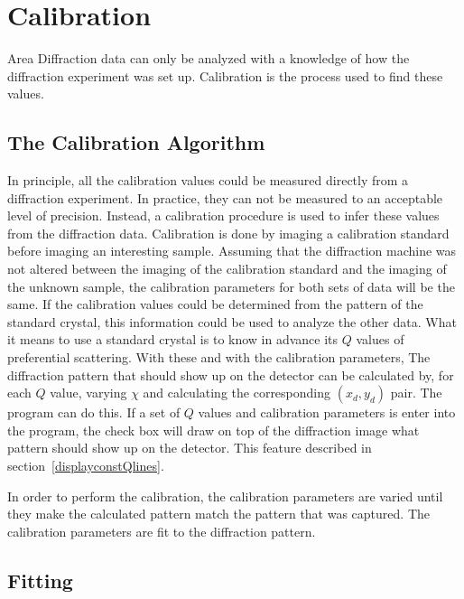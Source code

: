 \chapter{Calibration}\label{calibration}

Area Diffraction data can only be analyzed with
a knowledge of how the diffraction experiment was 
set up. Calibration is the process used to find these
values.

\section{The Calibration Algorithm}
    \label{cal_algorithm}

In principle, all the calibration values could be
measured directly from a diffraction experiment.
In practice, they can not be measured to an 
acceptable level of precision. 
Instead, a calibration procedure is used to 
infer these values from the diffraction data. 
Calibration is done by imaging a calibration standard
before imaging an interesting sample. Assuming 
that the diffraction machine was not altered between the 
imaging of the calibration standard and the 
imaging of the unknown sample, 
the calibration parameters for both sets of data 
will be the same. 
If the calibration values could be determined from
the pattern of the standard crystal, this information 
could be used to analyze the other data.
What it means to use a standard crystal is to know 
in advance its $Q$ values of preferential 
scattering. With these and with the
calibration parameters,
The diffraction pattern that should show up on the detector can
be calculated by, 
for each $Q$ value, varying $\chi$ and calculating the 
corresponding $(x_d,y_d)$ pair. The program can do this. 
If a set of $Q$ values and calibration parameters is enter into 
the program, the  check box 
will draw on top of the diffraction
image what pattern should show up on the detector.
This feature described in section~\ref{displayconstQlines}.

In order to perform the calibration, the calibration parameters 
are varied until they make the calculated pattern match the pattern 
that was captured. The calibration parameters are fit to the 
diffraction pattern. 

\section{Fitting} 
\label{fitting_sec}

